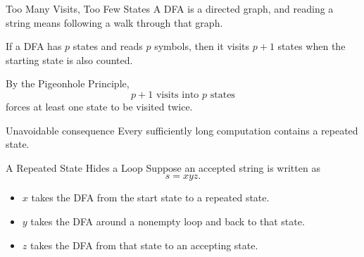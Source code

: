 \documentclass[10pt,aspectratio=169]{beamer}
\begin{document}
\begin{frame}{Too Many Visits, Too Few States}
A DFA is a directed graph, and reading a string means following a walk
through that graph.

\vspace{0.7em}
If a DFA has $p$ states and reads $p$ symbols, then it visits $p+1$
states when the starting state is also counted.

\vspace{0.7em}
By the Pigeonhole Principle,
\[
p+1\text{ visits into }p\text{ states}
\]
forces at least one state to be visited twice.

\begin{alertblock}{Unavoidable consequence}
Every sufficiently long computation contains a repeated state.
\end{alertblock}
\end{frame}

\begin{frame}{A Repeated State Hides a Loop}
Suppose an accepted string is written as
\[
s=xyz.
\]

\begin{itemize}
    \item $x$ takes the DFA from the start state to a repeated state.
    \item $y$ takes the DFA around a nonempty loop and back to that state.
    \item $z$ takes the DFA from that state to an accepting state.
\end{itemize}

\begin{center}
\end{center}
\end{frame}
\end{document}
